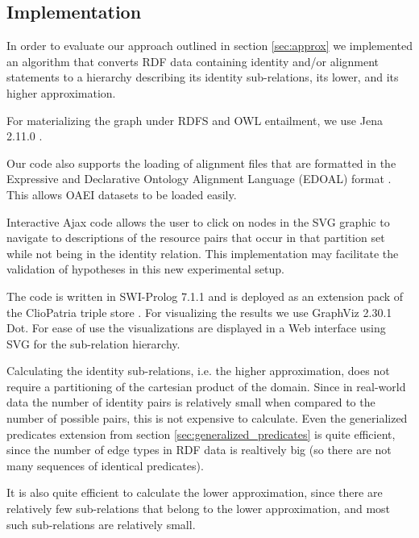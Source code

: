 \subsection{Implementation}
\label{sec:implementation}

In order to evaluate our approach outlined in section \ref{sec:approx}
  we implemented an algorithm that converts RDF data
  containing identity and/or alignment statements
  to a hierarchy describing its identity sub-relations,
  its lower, and its higher approximation.

For materializing the graph under RDFS and OWL entailment,
  we use Jena 2.11.0 \cite{Carroll2004}.

Our code also supports the loading of alignment files that are formatted in
  the Expressive and Declarative Ontology Alignment Language (EDOAL)
  format \cite{DavidEzenatScharffeTrojahn2011}.
This allows OAEI datasets to be loaded easily.

Interactive Ajax code allows the user to click on nodes in the SVG graphic
  to navigate to descriptions of the resource pairs that occur in
  that partition set while not being in the identity relation.
This implementation may facilitate the validation of hypotheses in this
  new experimental setup.

The code is written in SWI-Prolog 7.1.1 \cite{Wielemaker2003}
  and is deployed as an extension pack
  of the ClioPatria triple store \cite{Schreiber2006}.
For visualizing the results we use GraphViz 2.30.1 Dot.
For ease of use the visualizations are displayed in a Web interface
  using SVG for the sub-relation hierarchy.

Calculating the identity sub-relations, i.e. the higher approximation,
  does not require a partitioning of the cartesian product of the domain.
Since in real-world data the number of identity pairs
  is relatively small when compared to the number of possible pairs,
  this is not expensive to calculate.
Even the generialized predicates extension
  from section \ref{sec:generalized_predicates} is quite efficient,
  since the number of edge types in RDF data is realtively big
  (so there are not many sequences of identical predicates).

It is also quite efficient to calculate the lower approximation,
  since there are relatively few sub-relations
  that belong to the lower approximation,
  and most such sub-relations are relatively small.

